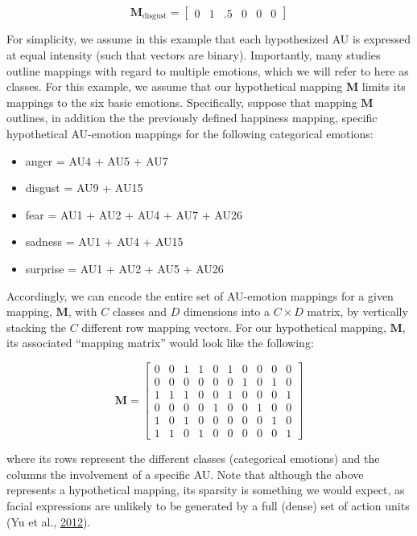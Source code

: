 \documentclass[12pt,american,a4paper,oneside,]{memoir} %
\providecommand{\tightlist}{%
  \setlength{\itemsep}{0pt}\setlength{\parskip}{0pt}}
\begin{document}
\begin{equation}
\mathbf{M}_{\mathrm{disgust}} = \begin{bmatrix} 0 & 1 & .5 & 0 & 0 & 0 \end{bmatrix}
\end{equation}

For simplicity, we assume in this example that each hypothesized AU is expressed at equal intensity (such that vectors are binary). Importantly, many studies outline mappings with regard to multiple emotions, which we will refer to here as classes. For this example, we assume that our hypothetical mapping \(\mathbf{M}\) limits its mappings to the six basic emotions. Specifically, suppose that mapping \(\mathbf{M}\) outlines, in addition the the previously defined happiness mapping, specific hypothetical AU-emotion mappings for the following categorical emotions:

\begin{itemize}
\tightlist
\item
  anger = AU4 + AU5 + AU7
\item
  disgust = AU9 + AU15
\item
  fear = AU1 + AU2 + AU4 + AU7 + AU26
\item
  sadness = AU1 + AU4 + AU15
\item
  surprise = AU1 + AU2 + AU5 + AU26
\end{itemize}

Accordingly, we can encode the entire set of AU-emotion mappings for a given mapping, \(\mathbf{M}\), with \(C\) classes and \(D\) dimensions into a \(C \times D\) matrix, by vertically stacking the \(C\) different row mapping vectors. For our hypothetical mapping, \(\mathbf{M}\), its associated ``mapping matrix'' would look like the following:

\begin{equation}
\mathbf{M} = \begin{bmatrix}
0 & 0 & 1 & 1 & 0 & 1 & 0 & 0 & 0 & 0 \\
0 & 0 & 0 & 0 & 0 & 0 & 1 & 0 & 1 & 0 \\
1 & 1 & 1 & 0 & 0 & 1 & 0 & 0 & 0 & 1 \\
0 & 0 & 0 & 0 & 1 & 0 & 0 & 1 & 0 & 0 \\
1 & 0 & 1 & 0 & 0 & 0 & 0 & 0 & 1 & 0 \\
1 & 1 & 0 & 1 & 0 & 0 & 0 & 0 & 0 & 1
\end{bmatrix}
\end{equation}

where its rows represent the different classes (categorical emotions) and the columns the involvement of a specific AU. Note that although the above represents a hypothetical mapping, its sparsity is something we would expect, as facial expressions are unlikely to be generated by a full (dense) set of action units (Yu et al., \protect\hyperlink{ref-Yu2012-ag}{2012}).
\end{document}
